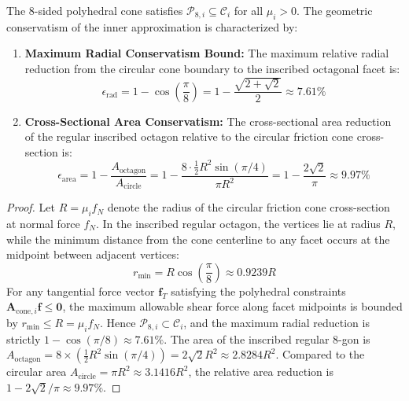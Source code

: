 \begin{theorem}
\label{thm:polyhedral_bound}
The 8-sided polyhedral cone satisfies $\mathcal{P}_{8, i} \subseteq \mathcal{C}_i$ for all $\mu_i > 0$. The geometric conservatism of the inner approximation is characterized by:
\begin{enumerate}
    \item \textbf{Maximum Radial Conservatism Bound:} The maximum relative radial reduction from the circular cone boundary to the inscribed octagonal facet is:
    \begin{equation}
        \epsilon_{\text{rad}} = 1 - \cos\left(\frac{\pi}{8}\right) = 1 - \frac{\sqrt{2 + \sqrt{2}}}{2} \approx 7.61\%
    \end{equation}
    \item \textbf{Cross-Sectional Area Conservatism:} The cross-sectional area reduction of the regular inscribed octagon relative to the circular friction cone cross-section is:
    \begin{equation}
        \epsilon_{\text{area}} = 1 - \frac{A_{\text{octagon}}}{A_{\text{circle}}} = 1 - \frac{8 \cdot \frac{1}{2} R^2 \sin(\pi/4)}{\pi R^2} = 1 - \frac{2\sqrt{2}}{\pi} \approx 9.97\%
    \end{equation}
\end{enumerate}
\end{theorem}
\begin{proof}
Let $R = \mu_i f_N$ denote the radius of the circular friction cone cross-section at normal force $f_N$. In the inscribed regular octagon, the vertices lie at radius $R$, while the minimum distance from the cone centerline to any facet occurs at the midpoint between adjacent vertices:
\begin{equation}
    r_{\min} = R \cos\left(\frac{\pi}{8}\right) \approx 0.9239 R
\end{equation}
For any tangential force vector $\mathbf{f}_T$ satisfying the polyhedral constraints $\mathbf{A}_{\text{cone}, i} \mathbf{f} \le \mathbf{0}$, the maximum allowable shear force along facet midpoints is bounded by $r_{\min} \le R = \mu_i f_N$. Hence $\mathcal{P}_{8, i} \subset \mathcal{C}_i$, and the maximum radial reduction is strictly $1 - \cos(\pi/8) \approx 7.61\%$. The area of the inscribed regular 8-gon is $A_{\text{octagon}} = 8 \times (\frac{1}{2} R^2 \sin(\pi/4)) = 2\sqrt{2} R^2 \approx 2.8284 R^2$. Compared to the circular area $A_{\text{circle}} = \pi R^2 \approx 3.1416 R^2$, the relative area reduction is $1 - 2\sqrt{2}/\pi \approx 9.97\%$.
\end{proof}

